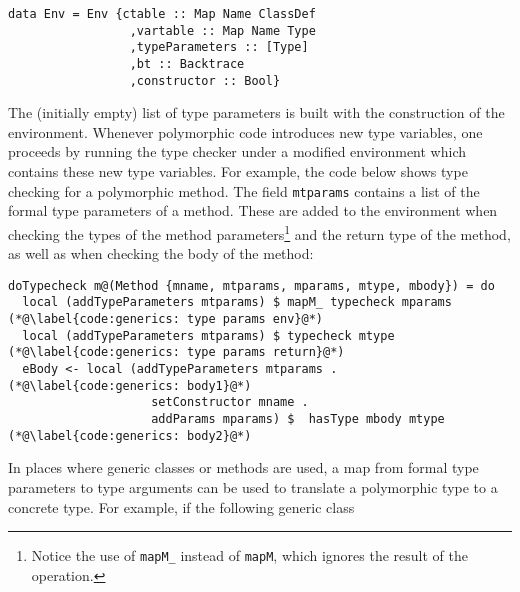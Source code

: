 \documentclass[sigplan,screen]{acmart}
\makeatletter
\newcommand{\ec}[1]{\lstinline[style=encore,breaklines=true,basicstyle=\fontsize{9}{9}\tt]@#1@}
\makeatother
\begin{document}
\begin{minipage}[t]{.50\linewidth}
\begin{lstlisting}[style=encore]
data Env = Env {ctable :: Map Name ClassDef
                 ,vartable :: Map Name Type
                 ,typeParameters :: [Type]
                 ,bt :: Backtrace
                 ,constructor :: Bool}
\end{lstlisting}
\end{minipage}

The (initially empty) list of type parameters is built with the construction of the environment.
Whenever polymorphic code introduces new type variables,
one proceeds by running the type checker under a modified environment
which contains these new type variables.
%
For example, the code below shows type checking for a polymorphic
method. The field \ec{mtparams} contains a list of the formal type
parameters of a method. These are added to the environment when
checking the types of the method parameters\footnote{ Notice
  the use of \ec{mapM_} instead of \ec{mapM}, which ignores the
  result of the operation. } and the return type of
the method, %
as well as when checking the body of the method:

\begin{minipage}[t]{\linewidth}
\begin{lstlisting}[style=encore]
doTypecheck m@(Method {mname, mtparams, mparams, mtype, mbody}) = do
  local (addTypeParameters mtparams) $ mapM_ typecheck mparams (*@\label{code:generics: type params env}@*)
  local (addTypeParameters mtparams) $ typecheck mtype (*@\label{code:generics: type params return}@*)
  eBody <- local (addTypeParameters mtparams . (*@\label{code:generics: body1}@*)
                    setConstructor mname .
                    addParams mparams) $  hasType mbody mtype (*@\label{code:generics: body2}@*)
\end{lstlisting}
\end{minipage}

In places where generic classes or methods are used, a map from
formal type parameters to type arguments can be used to translate
a polymorphic type to a concrete type. For example, if the
following generic class
\end{document}
